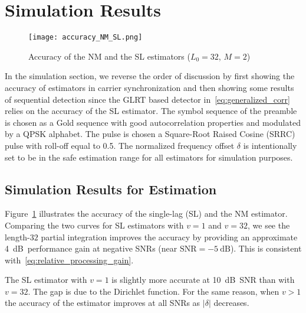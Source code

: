 \section{Simulation Results}%
\label{sec:simulations}

\begin{figure}[t]
    \centerline{\texttt{[image: accuracy\_NM\_SL.png]}}
    \caption{Accuracy of the NM and the SL estimators ($L_0=32$, $M=2$)}
    \label{fig:accuracy_NM_SL}
    \end{figure}

In the simulation section, we reverse the order of discussion by first showing 
the accuracy of estimators in carrier synchronization and then showing some results of sequential detection since
the GLRT based detector in~\eqref{eq:generalized_corr} relies on the accuracy of 
the SL estimator.
The symbol sequence of the preamble is chosen as a Gold sequence 
with good autocorrelation properties and
modulated by a QPSK alphabet.
The pulse is chosen a
Square-Root Raised Cosine (SRRC) pulse with roll-off equal to 0.5.
The normalized frequency offset $\delta$ is intentionally set to be in
the safe estimation range for all estimators for simulation purposes. 

\subsection{Simulation Results for Estimation}%


Figure~\ref{fig:accuracy_NM_SL} illustrates the accuracy of the single-lag (SL) and the NM estimator.
Comparing the two curves for SL estimators with $v=1$ and $v=32$, 
we see the length-$32$ partial integration
improves the accuracy by providing an approximate
\SI{4}{\dB}~performance gain at negative SNRs
(near $\text{SNR}=\SI{-5}{\dB}$). This is consistent
with~\eqref{eq:relative_processing_gain}.

The SL estimator with $v=1$ is slightly more accurate
at \SI{10}{\dB}~SNR than with $v=32$.
The gap is due to the Dirichlet function.
For the same reason,
when $v>1$
the accuracy of the estimator improves at all SNRs as $|\delta|$ decreases.

